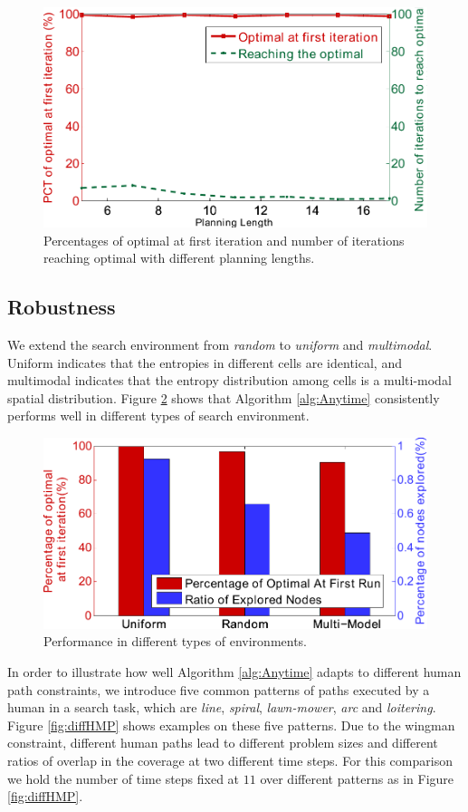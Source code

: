 \begin{figure}
\centering
\includegraphics[width=0.7\linewidth]{./images/T_InitOpt_OptRch.pdf}
\caption{Percentages of optimal at first iteration and number of iterations reaching optimal with different planning lengths.}
\label{fig:diffT:a2}
\end{figure}

\subsection{Robustness}

We extend the search environment from \emph{random} to \emph{uniform} and \emph{multimodal}.
Uniform indicates that the entropies in different cells are identical, and multimodal indicates that the entropy distribution among cells is a multi-modal spatial distribution.
Figure \ref{fig:EnvPerform} shows that Algorithm \ref{alg:Anytime} consistently performs well in different types of search environment.

\begin{figure}
\centering
\includegraphics[width=0.7\linewidth]{./images/EnvPerform}
\caption{Performance in different types of environments.}
\label{fig:EnvPerform}
\end{figure}

In order to illustrate how well Algorithm \ref{alg:Anytime} adapts to different human path constraints, we introduce five common patterns of paths executed by a human in a search task, which are \emph{line}, \emph{spiral}, \emph{lawn-mower}, \emph{arc} and \emph{loitering}.
Figure \ref{fig:diffHMP} shows examples on these five patterns.
Due to the wingman constraint, different human paths lead to different problem sizes and different ratios of overlap in the coverage at two different time steps.
For this comparison we hold the number of time steps fixed at $ 11 $ over different patterns as in Figure \ref{fig:diffHMP}. 

